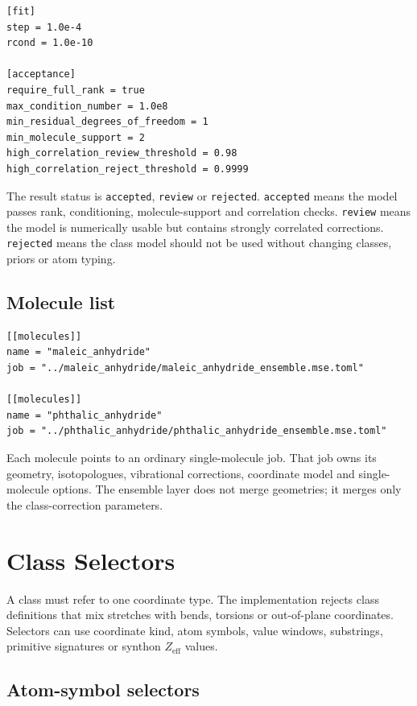 \documentclass[11pt]{article}
\newcommand{\zeff}{Z_\mathrm{eff}}
\begin{document}
\begin{lstlisting}[style=merlino]
[fit]
step = 1.0e-4
rcond = 1.0e-10

[acceptance]
require_full_rank = true
max_condition_number = 1.0e8
min_residual_degrees_of_freedom = 1
min_molecule_support = 2
high_correlation_review_threshold = 0.98
high_correlation_reject_threshold = 0.9999
\end{lstlisting}

\noindent
The result status is \texttt{accepted}, \texttt{review} or \texttt{rejected}.
\texttt{accepted} means the model passes rank, conditioning, molecule-support
and correlation checks.  \texttt{review} means the model is numerically usable
but contains strongly correlated corrections.  \texttt{rejected} means the
class model should not be used without changing classes, priors or atom typing.

\subsection{Molecule list}

\begin{lstlisting}[style=merlino]
[[molecules]]
name = "maleic_anhydride"
job = "../maleic_anhydride/maleic_anhydride_ensemble.mse.toml"

[[molecules]]
name = "phthalic_anhydride"
job = "../phthalic_anhydride/phthalic_anhydride_ensemble.mse.toml"
\end{lstlisting}

\noindent
Each molecule points to an ordinary single-molecule job.  That job owns its
geometry, isotopologues, vibrational corrections, coordinate model and
single-molecule options.  The ensemble layer does not merge geometries; it
merges only the class-correction parameters.

\section{Class Selectors}

A class must refer to one coordinate type.  The implementation rejects class
definitions that mix stretches with bends, torsions or out-of-plane
coordinates.  Selectors can use coordinate kind, atom symbols, value windows,
substrings, primitive signatures or synthon \(\zeff\) values.

\subsection{Atom-symbol selectors}
\end{document}
